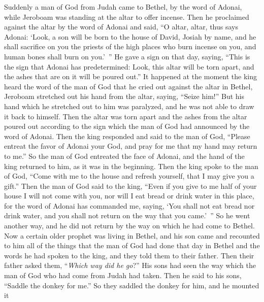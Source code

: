 \begin{biblechapter} %
 Suddenly a man of God from Judah came to Bethel, by the word of Adonai, while Jeroboam was standing at the altar to offer incense.
\verse Then he proclaimed against the altar by the word of Adonai and said, “O altar, altar, thus says Adonai: ‘Look, a son will be born to the house of David, Josiah by name, and he shall sacrifice on you the priests of the high places who burn incense on you, and human bones shall burn on you.’ ”
\verse He gave a sign on that day, saying, “This is the sign that Adonai has predetermined: Look, this altar will be torn apart, and the ashes that are on it will be poured out.”
\verse It happened at the moment the king heard the word of the man of God that he cried out against the altar in Bethel, Jeroboam stretched out his hand from the altar, saying, “Seize him!” But his hand which he stretched out to him was paralyzed, and he was not able to draw it back to himself.
\verse Then the altar was torn apart and the ashes from the altar poured out according to the sign which the man of God had announced by the word of Adonai.
\verse Then the king responded and said to the man of God, “Please entreat the favor of Adonai your God, and pray for me that my hand may return to me.” So the man of God entreated the face of Adonai, and the hand of the king returned to him, as it was in the beginning.
\verse Then the king spoke to the man of God, “Come with me to the house and refresh yourself, that I may give you a gift.”
\verse Then the man of God said to the king, “Even if you give to me half of your house I will not come with you, nor will I eat bread or drink water in this place,
\verse for the word of Adonai has commanded me, saying, ‘You shall not eat bread nor drink water, and you shall not return on the way that you came.’ ”
\verse So he went another way, and he did not return by the way on which he had come to Bethel.
 Now a certain older prophet was living in Bethel, and his son came and recounted to him all of the things that the man of God had done that day in Bethel and the words he had spoken to the king, and they told them to their father.
\verse Then their father asked them, “\textit{Which way did he go}?” His sons had seen the way which the man of God who had come from Judah had taken.
\verse Then he said to his sons, “Saddle the donkey for me.” So they saddled the donkey for him, and he mounted it

\end{biblechapter}
